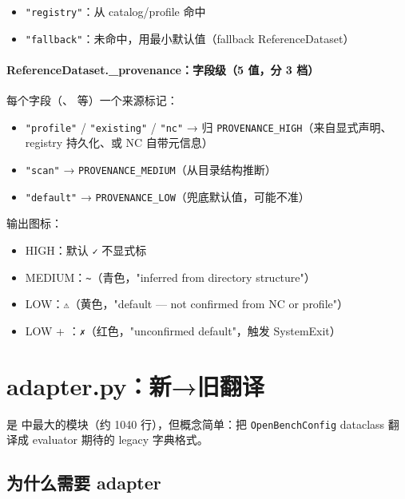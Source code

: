 \begin{itemize}
  \item \texttt{"registry"}：从 catalog/profile 命中
  \item \texttt{"fallback"}：未命中，用最小默认值（fallback ReferenceDataset）
\end{itemize}

\paragraph{ReferenceDataset.\_provenance：字段级（5 值，分 3 档）}

每个字段（、 等）一个来源标记：

\begin{itemize}
  \item \texttt{"profile"} / \texttt{"existing"} / \texttt{"nc"} → 归 \texttt{PROVENANCE\_HIGH}（来自显式声明、registry 持久化、或 NC 自带元信息）
  \item \texttt{"scan"} → \texttt{PROVENANCE\_MEDIUM}（从目录结构推断）
  \item \texttt{"default"} → \texttt{PROVENANCE\_LOW}（兜底默认值，可能不准）
\end{itemize}

 输出图标：
\begin{itemize}
  \item HIGH：默认 \texttt{✓} 不显式标
  \item MEDIUM：\texttt{\textasciitilde}\hspace{0.2em}（青色，"inferred from directory structure"）
  \item LOW：\texttt{⚠}（黄色，"default — not confirmed from NC or profile"）
  \item LOW + ：\texttt{✗}（红色，"unconfirmed default"，触发 SystemExit）
\end{itemize}

\section{adapter.py：新→旧翻译}

 是  中最大的模块（约 1040 行），但概念简单：把 \texttt{OpenBenchConfig} dataclass 翻译成 evaluator 期待的 legacy 字典格式。

\subsection{为什么需要 adapter}

